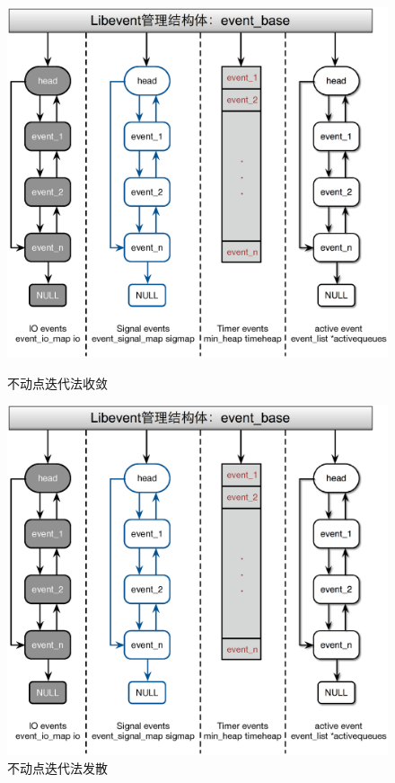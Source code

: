 \begin{figure}[h]
\begin{minipage}[t]{0.5\linewidth}
\centering
\includegraphics[totalheight=1.2in]{fig/tu2-2}
\caption{不动点迭代法收敛} \label{fig:tu2-2}
\end{minipage}

\begin{minipage}[t]{0.5\linewidth}
\centering
\includegraphics[totalheight=1.3in]{fig/tu2-3}
\caption{不动点迭代法发散} \label{fig:tu2-3}
\end{minipage}
\end{figure}



\vspace{0.5cm}
 \centerline{\textcolor{black}{}}\vspace{0.5cm}



